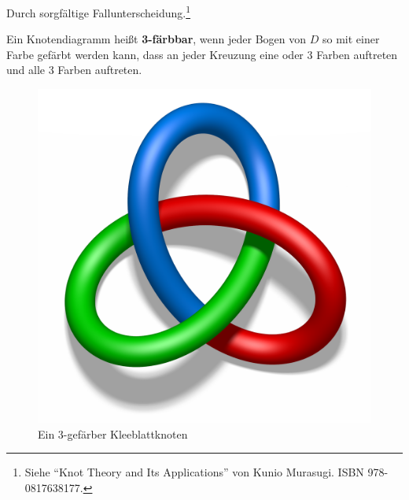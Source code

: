 \begin{beweis}
    Durch sorgfältige Fallunterscheidung.\footnote{Siehe \enquote{Knot Theory and Its Applications} von Kunio Murasugi. ISBN 978-0817638177.}
\end{beweis}

\begin{definition}%
    Ein Knotendiagramm heißt \textbf{3-färbbar}, 
    wenn jeder Bogen von $D$ so mit einer Farbe gefärbt werden kann, 
    dass an jeder Kreuzung eine oder 3 Farben auftreten und alle 3 
    Farben auftreten.
\end{definition}

\begin{figure}[htp]
    \centering
    \includegraphics[height=0.3\linewidth, keepaspectratio]{figures/tricoloring.png} 

    \caption{Ein 3-gefärber Kleeblattknoten}
    \label{fig:treefoil-knot-three-colors}
\end{figure}


